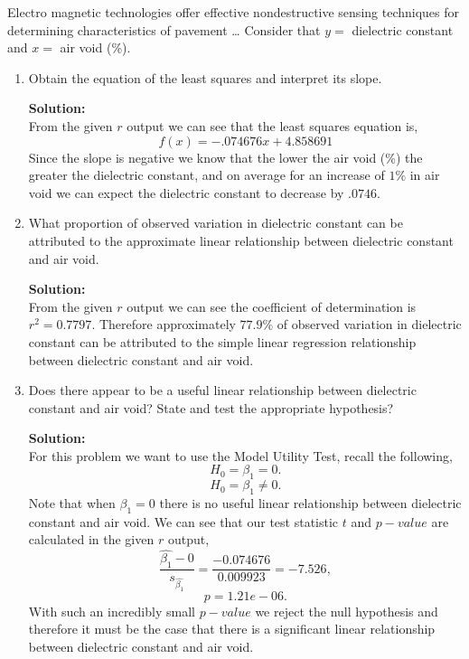 \documentclass[12pt]{article}
\makeatletter
\theoremstyle{homework}
\newenvironment{exercise}[1]
{\def\@currentlabel{#1}\exercisecore}
{\endexercisecore}
\newcommand{\localhead}[1]{\par\smallskip\noindent\textbf{#1}\nobreak\\}%
\newcommand\solution{\localhead{Solution:}}
\makeatother
\begin{document}
\begin{exercise}{12.34} Electro magnetic technologies offer effective nondestructive sensing techniques for determining characteristics of pavement \dots
  Consider that $y =$ dielectric constant and $x =$ air void (\%).\\
\begin{enumerate}
  \item Obtain the equation of the least squares and interpret its slope.\\
  \solution From the given $r$ output we can see that the least squares equation is,
  \begin{equation*}
    f(x) = -.074676x + 4.858691
  \end{equation*}
  Since the slope is negative we know that the lower the air void (\%) the greater the dielectric constant, and on average for an increase of 
  $1\%$ in air void we can expect the dielectric constant to decrease by $.0746$.
  \vspace{.25in}

  \item What proportion of observed variation in dielectric constant can be attributed to the approximate linear relationship between dielectric
  constant and air void.\\
  \solution From the given $r$ output we can see the coefficient of determination is $r^2 = 0.7797$. Therefore  approximately $77.9\%$ of observed variation in dielectric
  constant can be attributed to the simple linear regression relationship between dielectric constant and air void.
  \vspace{.25in}

  \item Does there appear to be a useful linear relationship between dielectric constant and air void? State and test the appropriate hypothesis?
  \solution For this problem we want to use the Model Utility Test, recall the following,
  \begin{equation*}
    H_0 = \beta_1 = 0.
  \end{equation*}
  \begin{equation*}
    H_0 = \beta_1 \neq 0.
  \end{equation*}
Note that when $\beta_1 = 0$ there is no useful linear relationship between dielectric constant and air void. We can see that our test statistic $t$
and $p- value$ are calculated in the given $r$ output,
  \begin{equation*}
  \dfrac{\hat{\beta_1} - 0}{s_{\hat{\beta_1}}} = \dfrac{-0.074676}{0.009923} = -7.526,
  \end{equation*}
  \begin{equation*}
    p = 1.21e-06.
  \end{equation*}
  With such an incredibly small $p - value$ we reject the null hypothesis and therefore it must be the case that there is a significant linear relationship between dielectric constant and air void.
  \vspace{.25in}


\end{enumerate}
\end{exercise}
\end{document}

